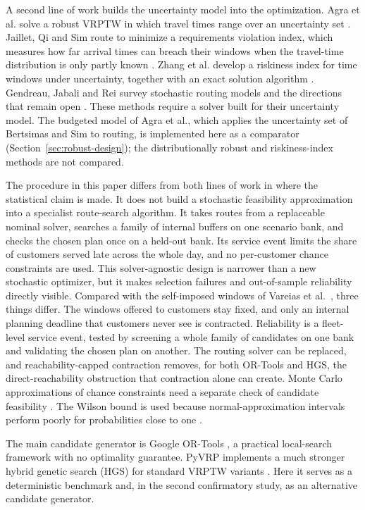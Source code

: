 \documentclass[11pt,a4paper]{article}
\begin{document}
A second line of work builds the uncertainty model into the optimization. Agra
et al. solve a robust VRPTW in which travel times range over an uncertainty set
\cite{agra2013}. Jaillet, Qi and Sim route to minimize a requirements violation
index, which measures how far arrival times can breach their windows when the
travel-time distribution is only partly known \cite{jaillet2016}. Zhang et al.
develop a riskiness index for time windows under uncertainty, together with an
exact solution algorithm \cite{zhang2019}. Gendreau, Jabali and Rei survey
stochastic routing models and the directions that remain open
\cite{gendreau2016}. These methods require a solver built for their uncertainty
model. The budgeted model of Agra et al., which applies the uncertainty set of
Bertsimas and Sim \cite{bertsimas2004} to routing, is implemented here as a
comparator (Section~\ref{sec:robust-design}); the distributionally robust and
riskiness-index methods \cite{jaillet2016,zhang2019} are not compared.

The procedure in this paper differs from both lines of work in where the
statistical claim is made. It does not build a stochastic feasibility
approximation into a specialist route-search algorithm. It takes routes from a
replaceable nominal solver, searches a family of internal buffers on one scenario
bank, and checks the chosen plan once on a held-out bank. Its service event
limits the share of customers served late across the whole day, and no
per-customer chance constraints are used. This solver-agnostic design is narrower
than a new stochastic optimizer, but it makes selection failures and
out-of-sample reliability directly visible. Compared with the self-imposed windows
of Vareias et al.\ \cite{vareias2019}, three things differ. The windows offered to customers stay
fixed, and only an internal planning deadline that customers never see is
contracted. Reliability is a fleet-level service event, tested by screening a
whole family of candidates on one bank and validating the chosen plan on
another. The routing solver can be replaced, and reachability-capped
contraction removes, for both OR-Tools and HGS, the direct-reachability
obstruction that contraction alone can create.
Monte Carlo approximations of chance constraints
need a separate check of candidate feasibility \cite{ahmed2008}. The Wilson bound
is used because normal-approximation intervals perform poorly for probabilities
close to one \cite{wilson1927,brown2001}.

The main candidate generator is Google OR-Tools \cite{ortools}, a practical
local-search framework with no optimality guarantee. PyVRP implements a much
stronger hybrid genetic search (HGS) for standard VRPTW variants
\cite{vidal2022,wouda2024}. Here it serves as a deterministic benchmark and, in
the second confirmatory study, as an alternative candidate generator.
\end{document}
